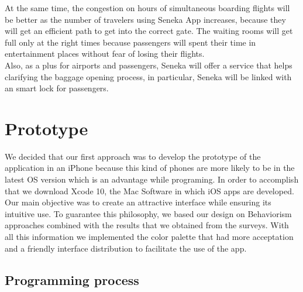 \documentclass[]{article}
\begin{document}
At the same time, the congestion on hours of simultaneous boarding flights will be better as the number of travelers using Seneka App increases, because they will get an efficient path to get into the correct gate. The waiting rooms will get full only at the right times because passengers will spent their time in entertainment places without fear of losing their flights.\\

Also, as a plus for airports and passengers, Seneka will offer a service that helps clarifying the baggage opening process, in particular, Seneka will be linked with an smart lock for passengers.\\  

\section{Prototype}

We decided that our first approach was to develop the prototype of the application in an iPhone because this kind of phones are more likely to be in the latest OS version which is an advantage while programing. In order to accomplish that we download Xcode 10, the Mac Software in which iOS apps are developed. Our main objective was to create an attractive interface while ensuring its intuitive use. To guarantee this philosophy, we based our design on Behaviorism approaches combined with the results that we obtained from the surveys. With all this information we implemented the color palette that had more acceptation and a friendly interface distribution to facilitate the use of the app. \\

\subsection{Programming process}
\end{document}
